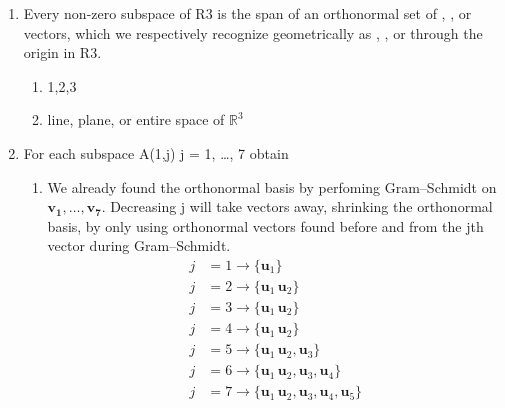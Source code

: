\documentclass[12pt]{article}
\begin{document}
\begin{enumerate}
          \vspace{1em}

    \item{} Every non-zero subspace of R3 is the span of an orthonormal set of , , or vectors, which we respectively recognize
          geometrically as , , or through the origin in R3.
          \begin{enumerate}
              \item{}1,2,3

              \item{} line, plane, or entire space of $\mathbb{R}^3$
          \end{enumerate}

          \vspace{1em}

    \item{} For each subspace A(1,j) j = 1, \dots, 7 obtain
          \begin{enumerate}
              \item{}
                    We already found the orthonormal basis by perfoming Gram–Schmidt on \(\mathbf{v_1} , \ldots, \mathbf{v_7}\).
                    Decreasing j will take vectors away, shrinking the orthonormal basis, by only using  orthonormal vectors found before and from the jth vector during Gram–Schmidt.
                    \begin{align*}
                        j & =1 \rightarrow{} \{\mathbf{u}_1\}                                                           \\
                        j & =2 \rightarrow{} \{\mathbf{u}_1\, \mathbf{u}_2 \}                                           \\
                        j & =3 \rightarrow{} \{\mathbf{u}_1\, \mathbf{u}_2 \}                                           \\
                        j & =4 \rightarrow{} \{\mathbf{u}_1\, \mathbf{u}_2 \}                                           \\
                        j & =5 \rightarrow{} \{\mathbf{u}_1\, \mathbf{u}_2, \mathbf{u}_3 \}                             \\
                        j & =6 \rightarrow{} \{\mathbf{u}_1\, \mathbf{u}_2, \mathbf{u}_3, \mathbf{u}_4 \}               \\
                        j & =7 \rightarrow{} \{\mathbf{u}_1\, \mathbf{u}_2, \mathbf{u}_3, \mathbf{u}_4, \mathbf{u}_5 \}
                    \end{align*}


\end{enumerate}
\end{enumerate}
\end{document}
